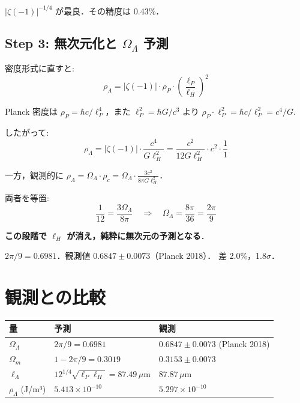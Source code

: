 \documentclass[11pt,a4paper]{article}
\begin{document}
$|\zeta(-1)|^{-1/4}$ が最良．その精度は 0.43\%．

\subsection{Step 3: 無次元化と $\Omega_\Lambda$ 予測}

密度形式に直すと:
\begin{equation}
\rho_\Lambda = |\zeta(-1)|\cdot\rho_P\cdot\left(\frac{\ell_P}{\ell_H}\right)^2
\end{equation}

Planck 密度は $\rho_P = \hbar c/\ell_P^4$，また $\ell_P^2 = \hbar G/c^3$
より $\rho_P \cdot \ell_P^2 = \hbar c/\ell_P^2 = c^4/G$.

したがって:
\begin{equation}
\rho_\Lambda = |\zeta(-1)|\cdot\frac{c^4}{G\ell_H^2} = \frac{c^2}{12 G\ell_H^2}\cdot c^2\cdot\frac{1}{1}
\end{equation}

一方，観測的に $\rho_\Lambda = \Omega_\Lambda\cdot\rho_c = \Omega_\Lambda\cdot\frac{3c^2}{8\pi G\ell_H^2}$．

両者を等置:
\begin{equation}
\frac{1}{12} = \frac{3\Omega_\Lambda}{8\pi}
\quad\Longrightarrow\quad
\Omega_\Lambda = \frac{8\pi}{36} = \frac{2\pi}{9}
\end{equation}

\textbf{この段階で $\ell_H$ が消え，純粋に無次元の予測となる}．

$2\pi/9 = 0.6981$．観測値 $0.6847 \pm 0.0073$（Planck 2018）．
差 2.0\%，1.8$\sigma$．

\section{観測との比較}

\begin{center}
\begin{tabular}{lll}
\toprule
量 & 予測 & 観測 \\
\midrule
$\Omega_\Lambda$ & $2\pi/9 = 0.6981$ & $0.6847 \pm 0.0073$ (Planck 2018) \\
$\Omega_m$ & $1 - 2\pi/9 = 0.3019$ & $0.3153 \pm 0.0073$ \\
$\ell_\Lambda$ & $12^{1/4}\sqrt{\ell_P\ell_H} = 87.49\,\mu$m & $87.87\,\mu$m \\
$\rho_\Lambda$ (J/m³) & $5.413\times 10^{-10}$ & $5.297\times 10^{-10}$ \\
\bottomrule
\end{tabular}
\end{center}
\end{document}
